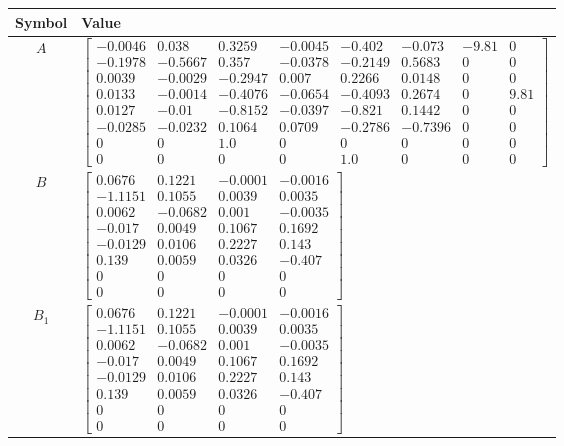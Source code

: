 \begin{tabular}{cl}
\hline
  Symbol  & Value                                                                                                                                                                                                                                                                                                                                                                                                                                                                                                        \\
\hline
   $A$    & $\left[\begin{matrix}-0.0046 & 0.038 & 0.3259 & -0.0045 & -0.402 & -0.073 & -9.81 & 0\\-0.1978 & -0.5667 & 0.357 & -0.0378 & -0.2149 & 0.5683 & 0 & 0\\0.0039 & -0.0029 & -0.2947 & 0.007 & 0.2266 & 0.0148 & 0 & 0\\0.0133 & -0.0014 & -0.4076 & -0.0654 & -0.4093 & 0.2674 & 0 & 9.81\\0.0127 & -0.01 & -0.8152 & -0.0397 & -0.821 & 0.1442 & 0 & 0\\-0.0285 & -0.0232 & 0.1064 & 0.0709 & -0.2786 & -0.7396 & 0 & 0\\0 & 0 & 1.0 & 0 & 0 & 0 & 0 & 0\\0 & 0 & 0 & 0 & 1.0 & 0 & 0 & 0\end{matrix}\right]$ \\
   $B$    & $\left[\begin{matrix}0.0676 & 0.1221 & -0.0001 & -0.0016\\-1.1151 & 0.1055 & 0.0039 & 0.0035\\0.0062 & -0.0682 & 0.001 & -0.0035\\-0.017 & 0.0049 & 0.1067 & 0.1692\\-0.0129 & 0.0106 & 0.2227 & 0.143\\0.139 & 0.0059 & 0.0326 & -0.407\\0 & 0 & 0 & 0\\0 & 0 & 0 & 0\end{matrix}\right]$                                                                                                                                                                                                                   \\
 $B_{1}$  & $\left[\begin{matrix}0.0676 & 0.1221 & -0.0001 & -0.0016\\-1.1151 & 0.1055 & 0.0039 & 0.0035\\0.0062 & -0.0682 & 0.001 & -0.0035\\-0.017 & 0.0049 & 0.1067 & 0.1692\\-0.0129 & 0.0106 & 0.2227 & 0.143\\0.139 & 0.0059 & 0.0326 & -0.407\\0 & 0 & 0 & 0\\0 & 0 & 0 & 0\end{matrix}\right]$                                                                                                                                                                                                                   \\

\end{tabular}
